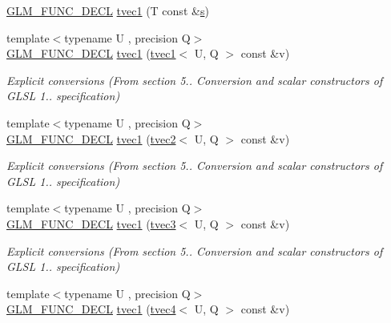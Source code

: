 \begin{DoxyCompactItemize}
\hyperlink{setup_8hpp_ab2d052de21a70539923e9bcbf6e83a51}{G\+L\+M\+\_\+\+F\+U\+N\+C\+\_\+\+D\+E\+CL} \hyperlink{structglm_1_1detail_1_1tvec1_adf94a9b437d8033044ea754fbbb18614}{tvec1} (T const \&\hyperlink{structglm_1_1detail_1_1tvec1_a1025b03a3e1f99c7a42518af40737d7b}{s})
\item 
{\footnotesize template$<$typename U , precision Q$>$ }\\\hyperlink{setup_8hpp_ab2d052de21a70539923e9bcbf6e83a51}{G\+L\+M\+\_\+\+F\+U\+N\+C\+\_\+\+D\+E\+CL} \hyperlink{structglm_1_1detail_1_1tvec1_a2dd9171451398b559b398d6c540db4a7}{tvec1} (\hyperlink{structglm_1_1detail_1_1tvec1}{tvec1}$<$ U, Q $>$ const \&v)
\begin{DoxyCompactList}\small\item\em Explicit conversions (From section 5.. Conversion and scalar constructors of G\+L\+SL 1.. specification) \end{DoxyCompactList}\item 
{\footnotesize template$<$typename U , precision Q$>$ }\\\hyperlink{setup_8hpp_ab2d052de21a70539923e9bcbf6e83a51}{G\+L\+M\+\_\+\+F\+U\+N\+C\+\_\+\+D\+E\+CL} \hyperlink{structglm_1_1detail_1_1tvec1_a74bfab7db08f995b924a21fbf6e97158}{tvec1} (\hyperlink{structglm_1_1detail_1_1tvec2}{tvec2}$<$ U, Q $>$ const \&v)
\begin{DoxyCompactList}\small\item\em Explicit conversions (From section 5.. Conversion and scalar constructors of G\+L\+SL 1.. specification) \end{DoxyCompactList}\item 
{\footnotesize template$<$typename U , precision Q$>$ }\\\hyperlink{setup_8hpp_ab2d052de21a70539923e9bcbf6e83a51}{G\+L\+M\+\_\+\+F\+U\+N\+C\+\_\+\+D\+E\+CL} \hyperlink{structglm_1_1detail_1_1tvec1_a553b324447da4de7c371c3d109317905}{tvec1} (\hyperlink{structglm_1_1detail_1_1tvec3}{tvec3}$<$ U, Q $>$ const \&v)
\begin{DoxyCompactList}\small\item\em Explicit conversions (From section 5.. Conversion and scalar constructors of G\+L\+SL 1.. specification) \end{DoxyCompactList}\item 
{\footnotesize template$<$typename U , precision Q$>$ }\\\hyperlink{setup_8hpp_ab2d052de21a70539923e9bcbf6e83a51}{G\+L\+M\+\_\+\+F\+U\+N\+C\+\_\+\+D\+E\+CL} \hyperlink{structglm_1_1detail_1_1tvec1_afa1ae0c07774e38092fc7c016ab28a58}{tvec1} (\hyperlink{structglm_1_1detail_1_1tvec4}{tvec4}$<$ U, Q $>$ const \&v)

\end{DoxyCompactItemize}
